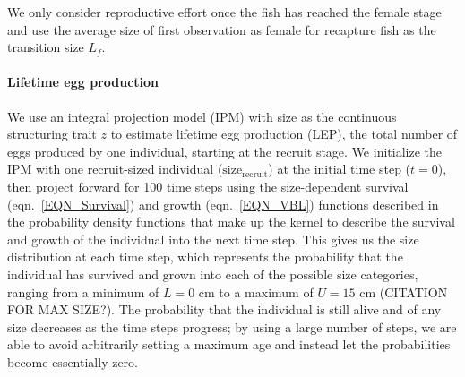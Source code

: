 \documentclass[12pt, oneside]{article}   	%
\begin{document}
We only consider reproductive effort once the fish has reached the female stage and use the average size of first observation as female for recapture fish as the transition size $L_f$.



\paragraph*{Lifetime egg production}
We use an integral projection model (IPM) \citep[e.g.][]{rees2014building} with size as the continuous structuring trait $z$ to estimate lifetime egg production (LEP), the total number of eggs produced by one individual, starting at the recruit stage. We initialize the IPM with one recruit-sized individual ($\text{size}_\text{recruit}$) at the initial time step ($t=0$), then project forward for 100 time steps using the size-dependent survival (eqn.\ \ref{EQN_Survival}) and growth (eqn.\ \ref{EQN_VBL}) functions described in the probability density functions that make up the kernel to describe the survival and growth of the individual into the next time step. This gives us the size distribution at each time step, which represents the probability that the individual has survived and grown into each of the possible size categories, ranging from a minimum of $L=0$ cm to a maximum of $U=15$ cm (CITATION FOR MAX SIZE?). The probability that the individual is still alive and of any size decreases as the time steps progress; by using a large number of steps, we are able to avoid arbitrarily setting a maximum age and instead let the probabilities become essentially zero. 
\end{document}
